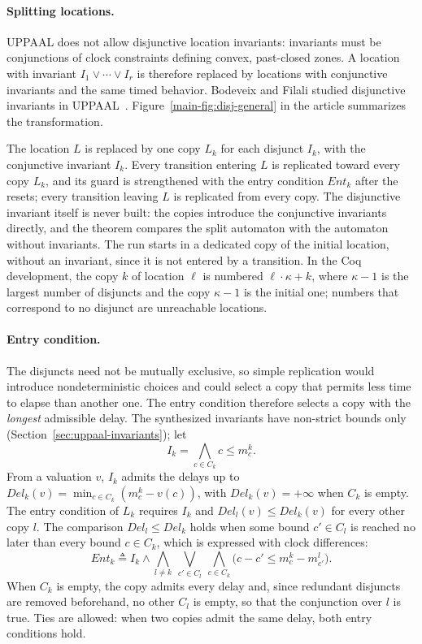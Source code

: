 \paragraph{Splitting locations.}
UPPAAL does not allow disjunctive location invariants: invariants must be
conjunctions of clock constraints defining convex, past-closed zones.  A
location with invariant $I_1\lor\cdots\lor I_r$ is therefore replaced by
locations with conjunctive invariants and the same timed behavior.  Bodeveix
and Filali studied disjunctive invariants in UPPAAL~\cite{[BF03]}.
Figure~\ref{main-fig:disj-general} in the article summarizes the transformation.

The location $L$ is replaced by one copy $L_k$ for each disjunct $I_k$, with
the conjunctive invariant $I_k$.  Every transition entering $L$ is replicated
toward every copy $L_k$, and its guard is strengthened with the entry condition
$\mathit{Ent}_k$ after the resets; every transition leaving $L$ is replicated from every
copy.  The disjunctive invariant itself is never built: the copies introduce
the conjunctive invariants directly, and the theorem compares the split
automaton with the automaton without invariants.  The run starts in a dedicated
copy of the initial location, without an invariant, since it is not entered by a
transition.  In the Coq development, the copy $k$ of location $\ell$ is numbered
$\ell\cdot\kappa+k$, where $\kappa-1$ is the largest number of disjuncts and the copy
$\kappa-1$ is the initial one; numbers that correspond to no disjunct are unreachable
locations.

\paragraph{Entry condition.}
The disjuncts need not be mutually exclusive, so simple replication would
introduce nondeterministic choices and could select a copy that permits less
time to elapse than another one.  The entry condition therefore selects a copy
with the \emph{longest} admissible delay.  The synthesized invariants have
non-strict bounds only (Section~\ref{sec:uppaal-invariants}); let
\[
  I_k = \bigwedge_{c\in C_k} c\le m^k_c.
\]
From a valuation $v$, $I_k$ admits the delays up to
$\mathit{Del}_k(v)=\min_{c\in C_k}(m^k_c-v(c))$, with $\mathit{Del}_k(v)=+\infty$ when $C_k$ is
empty.  The entry condition of $L_k$ requires $I_k$ and $\mathit{Del}_l(v)\le \mathit{Del}_k(v)$ for
every other copy $l$.  The comparison $\mathit{Del}_l\le \mathit{Del}_k$ holds when some bound
$c'\in C_l$ is reached no later than every bound $c\in C_k$, which is expressed
with clock differences:
\[
\mathit{Ent}_k\triangleq I_k \land
\bigwedge_{l\neq k}\ \bigvee_{c'\in C_l}\ \bigwedge_{c\in C_k}
 \bigl(c-c'\le m^k_c-m^l_{c'}\bigr).
\]
When $C_k$ is empty, the copy admits every delay and, since redundant
disjuncts are removed beforehand, no other $C_l$ is empty, so that the
conjunction over $l$ is true.  Ties are allowed: when two copies admit the same delay, both entry
conditions hold.

